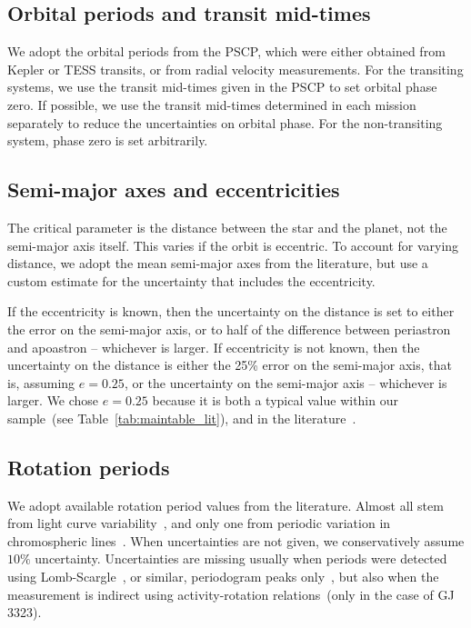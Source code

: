 \documentclass[twocolumn]{aastex631}
\begin{document}
\subsection{Orbital periods and transit mid-times}
\label{sec:data:orbitalperiod}
We adopt the orbital periods from the PSCP, which were either obtained from Kepler or TESS transits, or from radial velocity measurements. For the transiting systems, we use the transit mid-times given in the PSCP to set orbital phase zero. If possible, we use the transit mid-times determined in each mission separately to reduce the uncertainties on orbital phase. For the non-transiting system, phase zero is set arbitrarily.
\subsection{Semi-major axes and eccentricities}
\label{sec:data:a}
The critical parameter is the distance between the star and the planet, not the semi-major axis itself. This varies if the orbit is eccentric. To account for varying distance, we adopt the mean semi-major axes from the literature, but use a custom estimate for the uncertainty that includes the eccentricity.

If the eccentricity is known, then the uncertainty on the distance is set to either the error on the semi-major axis, or to half of the difference between periastron and apoastron -- whichever is larger. If eccentricity is not known, then the uncertainty on the distance is either the 25\% error on the semi-major axis, that is, assuming $e=0.25$, or the uncertainty on the semi-major axis -- whichever is larger. We chose $e=0.25$ because it is both a typical value within our sample~(see Table~\ref{tab:maintable_lit}), and in the literature~\citep{eylen2019orbital}.

\subsection{Rotation periods}
\label{sec:data:rotationperiods}
We adopt available rotation period values from the literature. Almost all stem from light curve variability~\citep{angus2018inferring, mazeh2015photometric, mcquillan2013stellar, mcquillan2014rotation, luger2017sevenplanet, stock2020carmenes, deleon202137, torres2017validation, stefansson2020habitable, zicher2022one, ment2021toi, rizzuto2020tess, gunther2020stellar}, and only one from periodic variation in chromospheric lines~\citep{demangeon2021warm}. When uncertainties are not given, we conservatively assume $10\%$ uncertainty. Uncertainties are missing usually when periods were detected using Lomb-Scargle~\citep{lomb1976leastsquares, scargle1982studies}, or similar, periodogram peaks only~\citep{gunther2020stellar, kiraga2007agerotationactivity, grankin2013magnetically, burt2014lickcarnegie}, but also when the measurement is indirect using activity-rotation relations~(only in the case of GJ 3323).
\end{document}
